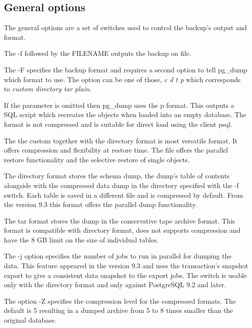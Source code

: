 \subsection{General options}
The general options are a set of switches used to control the backup's output and format. 

The -f followed by the FILENAME outputs the backup on file.\newline

The  -F specifies the backup format and requires a second 
option to tell pg\_dump which format to 
use. The option can be one of those, \textit{c d t p} which corresponds to 
\textit{custom directory tar plain}.\newline

If the parameter is omitted then pg\_dump uses the p format. This outputs a SQL script which 
recreates the objects when loaded into an empty database. The format is not compressed and is 
suitable for direct load using the client psql. 

The the custom together with the directory format is most versatile format. It offers compression 
and flexibility at restore time. The file offers the parallel restore functionality and the 
selective restore of single objects.\newline

The directory format stores the schema dump, the dump's table of contents alongside with the 
compressed data dump in the directory specified with the -f switch. Each table is saved in a 
different file and is compressed by default. From the version 9.3 this format offers the parallel 
dump functionality. \newline

The tar format stores the dump in the conservative tape archive format. This format is compatible 
with directory format, does not supports compression and have the 8 GB limit on the size of 
individual tables.\newline

The -j option specifies the number of jobs to run in parallel for dumping the data. This feature 
appeared in the version 9.3 and uses the transaction's snapshot export to give a consistent data 
snapshot to the export jobs. The switch is usable only with the directory format and only 
against PostgreSQL 9.2 and later.\newline 

The option -Z specifies the compression level for the compressed formats. The default is 5 
resulting in a dumped archive from 5 to 8 times smaller than the original database. 


